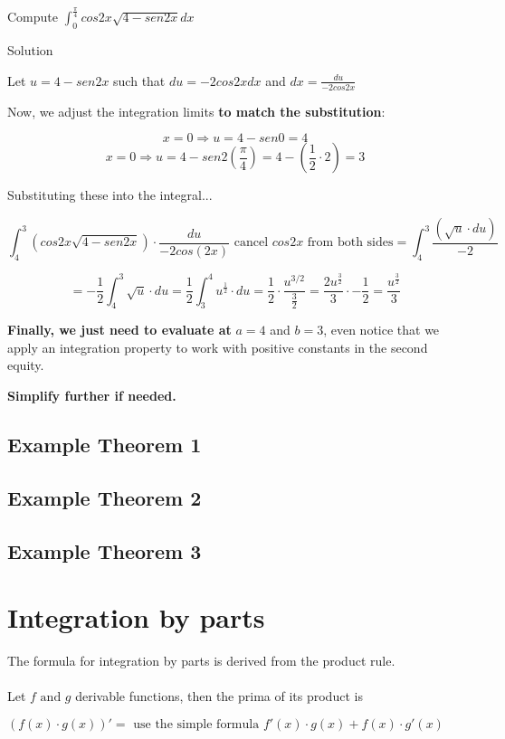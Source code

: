 \documentclass{article}
\begin{document}
Compute \(\int_{0}^{\frac{\pi}{4}} cos2x\sqrt{4-sen2x} dx\)

Solution

Let \(u = 4-sen2x\) such that \(du = -2cos2xdx\) and \(dx=\frac{du}{-2cos2x}\)

Now, we adjust the integration limits \textbf{to match the substitution}:

\[
x=0 \Rightarrow u = 4- sen 0 = 4
\]
\[x=0 \Rightarrow u = 4- sen 2 (\frac{\pi}{4}) = 4 - (\frac{1}{2} \cdot 2) = 3 \]

Substituting these into the integral...

\[
\int_{4}^{3} (cos2x
\sqrt{4-sen2x}) \cdot \frac{du}{-2cos(2x)} \text{ cancel \(cos2x\) from both sides} = \int_{4}^{3} \frac{(
\sqrt{u} \cdot du)}{-2}\]

\[
= -\frac{1}{2} \int_{4}^{3} \sqrt{u} \cdot du = \frac{1}{2} \int_{3}^{4} u^{\frac{1}{2}}\cdot du = \frac{1}{2} \cdot \frac{u^{3/2}}{\frac{3}{2}} = \frac{2u^{\frac{3}{2}}}{3} \cdot -\frac{1}{2} = \frac{u^{\frac{3}{2}}}{3}
\]

\textbf{Finally, we just need to evaluate at }\(a = 4\) and \(b=3\), even notice that we apply an integration property to work with positive constants in the second equity.

\textbf{Simplify further if needed.}

\subsection*{Example Theorem 1}

\subsection*{Example Theorem 2}

\subsection*{Example Theorem 3}

\section*{Integration by parts}
The formula for integration by parts is derived from the product rule.
\\
\\
Let \(f \text{ and } g\) derivable functions, then the prima of its product is 

\((f(x) \cdot g(x))' = \text{ use the simple formula } f'(x) \cdot g(x) + f(x) \cdot g'(x)\)
\end{document}

